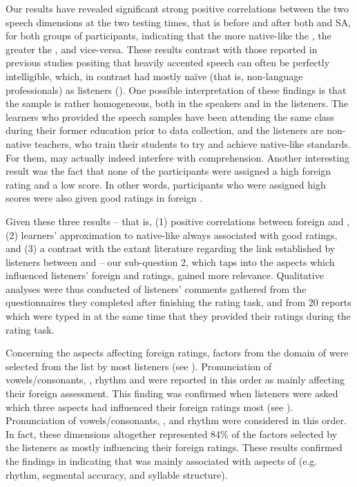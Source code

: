 \documentclass[output=paper]{langsci/langscibook}
\begin{document}
Our results have revealed significant strong positive correlations between the two speech dimensions at the two testing times, that is before and after both  and SA, for both groups of participants, indicating that the more native-like the , the greater the , and vice-versa. These results contrast with those reported in previous studies positing that heavily accented speech can often be perfectly intelligible, which, in contrast had mostly naïve (that is, non-language professionals)  as listeners (\citealt{MunroDerwing1995,MunroDerwing1999,DerwingMunro1997,GallardodelPuertoEtAl2007,Hayes-HarbWatzinger-Tharp2012}). One possible interpretation of these findings is that the sample is rather homogeneous, both in the speakers and in the listeners. The learners who provided the speech samples have been attending the same  class during their former education prior to data collection, and the listeners are non-native  teachers, who train their students to try and achieve native-like standards. For them,  may actually indeed interfere with comprehension. Another interesting result was the fact that none of the participants were assigned a high foreign  rating and a low  score. In other words, participants who were assigned high  scores were also given good ratings in foreign .

Given these three results – that is, 
(1) positive correlations between foreign  and , 
(2) learners’ approximation to native-like  always associated with good  ratings, and (3) a contrast with the extant literature regarding the link established by listeners between  and  – our sub-question 2, which taps into the aspects which influenced listeners’ foreign  and  ratings, gained more relevance. Qualitative analyses were thus conducted of listeners’ comments gathered from the questionnaires they completed after finishing the rating task, and from 20 reports which were typed in at the same time that they provided their ratings during the rating task. 

Concerning the aspects affecting foreign  ratings, factors from the domain of  were selected from the list by most listeners (see ). Pronunciation of vowels/consonants, , rhythm and  were reported in this order as mainly affecting their foreign  assessment. This finding was confirmed when listeners were asked which three aspects had influenced their foreign  ratings most (see ). Pronunciation of vowels/consonants, ,  and rhythm were considered in this order. In fact, these  dimensions altogether represented 84\% of the factors selected by the listeners as mostly influencing their foreign  ratings. These results confirmed the findings in \citet{TrofimovichIsaacs2012} indicating that  was mainly associated with aspects of  (e.g. rhythm, segmental accuracy, and syllable structure).
\end{document}
